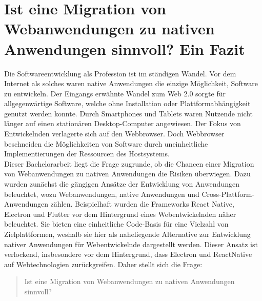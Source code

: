 \documentclass[a4paper]{scrartcl}
\begin{document}
\newpage

\section{Ist eine Migration von Webanwendungen zu nativen Anwendungen sinnvoll? Ein Fazit}
Die Softwareentwicklung als Profession ist im ständigen Wandel. Vor dem Internet als solches waren native Anwendungen die einzige Möglichkeit, Software zu entwickeln. Der Eingangs erwähnte Wandel zum Web 2.0 sorgte für allgegenwärtige Software, welche ohne Installation oder Plattformabhängigkeit genutzt werden konnte. Durch Smartphones und Tablets waren Nutzende nicht länger auf einen stationären Desktop-Computer angewiesen. Der Fokus von Entwickelnden verlagerte sich auf den Webbrowser. Doch Webbrowser beschneiden die Möglichkeiten von Software durch uneinheitliche Implementierungen der Ressourcen des Hostsystems. \\
Dieser Bachelorarbeit liegt die Frage zugrunde, ob die Chancen einer Migration von Webanwendungen zu nativen Anwendungen die Risiken überwiegen. Dazu wurden zunächst die gängigen Ansätze der Entwicklung von Anwendungen beleuchtet, wozu Webanwendungen, native Anwendungen und Cross-Plattform-Anwendungen zählen. Beispielhaft wurden die Frameworks React Native, Electron und Flutter vor dem Hintergrund eines Webentwickelnden näher beleuchtet. Sie bieten eine einheitliche Code-Basis für eine Vielzahl von Zielplattformen, weshalb sie hier als naheliegende Alternative zur Entwicklung nativer Anwendungen für Webentwickelnde dargestellt werden. Dieser Ansatz ist verlockend, insbesondere vor dem Hintergrund, dass Electron und ReactNative auf Webtechnologien zurückgreifen. Daher stellt sich die Frage: 

\begin{quote}
	Ist eine Migration von Webanwendungen zu nativen Anwendungen sinnvoll?	
\end{quote}
\end{document}
